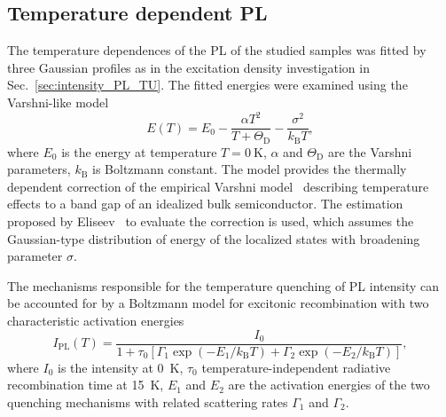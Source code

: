 \subsection{Temperature dependent PL}
\label{Sec:temp_PL_TU}
The temperature dependences of the PL of the studied samples was fitted by three Gaussian profiles as in the excitation density investigation in Sec.~\ref{sec:intensity_PL_TU}. The fitted energies were examined using the Varshni-like model
%
\begin{equation}
E(T)=E_0-\frac{\alpha T^2}{T+\Theta_\mathrm{D}}-\frac{\sigma^2}{k_\mathrm{B}T}, \label{eq:Varshni-like}
\end{equation}
where $E_0$ is the energy at temperature $T=0~\mathrm{K}$, $\alpha$ and $\Theta_\mathrm{D}$ are the Varshni parameters, $k_\mathrm{B}$ is Boltzmann constant. The model provides the thermally dependent correction of the empirical Varshni model~\citep{Varshni} describing temperature effects to a band gap of an idealized bulk semiconductor. The estimation proposed by Eliseev~\citep{Eliseev_apl2003_PLtemp} to evaluate the correction is used, which assumes the Gaussian-type distribution of energy of the localized states with broadening parameter $\sigma$.

The mechanisms responsible for the temperature quenching of PL intensity can be accounted for by a Boltzmann model for excitonic recombination with two characteristic activation energies~\citep{Daly_prb1995, Alen_apl2011}
\begin{equation}
I_\mathrm{PL}(T)=\frac{I_0}{1+\tau_0\left[\Gamma_1\exp(-E_1/k_\mathrm{B}T)+\Gamma_2\exp(-E_2/k_\mathrm{B}T)\right]},               \label{eq:Arhenius}
\end{equation}
where $I_0$ is the intensity at 0~K, $\tau_0$ temperature-independent radiative recombination time at 15~K, $E_1$ and $E_2$ are the activation energies of the two quenching mechanisms with related scattering rates $\Gamma_1$ and $\Gamma_2$.%
\newpage
